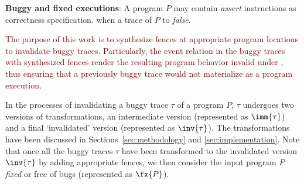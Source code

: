 
\noindent
{\bf Buggy and fixed executions}: A program $P$ may contain {\em assert} 
instructions as correctness specification. 
 when a trace of $P$ 
  to
{\em false}. 


\textcolor{Maroon}{The purpose of this work 
is to synthesize \cc fences at appropriate
program locations to invalidate buggy traces. Particularly, the
event relation in the buggy traces with synthesized fences
render the resulting program behavior invalid under \cc, thus ensuring
that a previously buggy trace would not materialize as a 
\cc program execution.} 

 


In the processes of invalidating a buggy trace $\tau$ of a program $P$,
$\tau$ undergoes two versions of transformations, an intermediate version
(represented as $\imm{\tau}$) and a final `invalidated' version (represented
as $\inv{\tau}$). The transformations have been discussed in 
Sections~\ref{sec:methodology} and \ref{sec:implementation}.
%
Note that once all the buggy traces $\tau$ have been transformed to 
the invalidated version
$\inv{\tau}$ by adding appropriate fences, we then consider the input 
program $P$ {\em fixed} or free of bugs (represented as $\fx{P}$). 